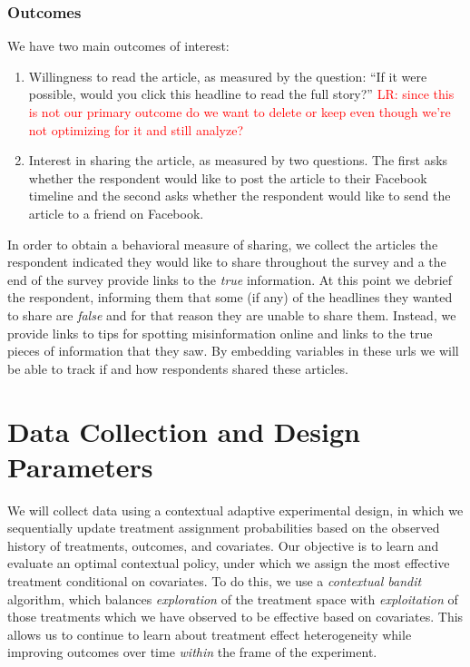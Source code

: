 \documentclass[letterpaper, 12pt, parskip=full,DIV=12]{scrartcl}
\begin{document}
\subsubsection{Outcomes}
We have two main outcomes of interest:

\begin{enumerate}
\item Willingness to read the article, as measured by the question: ``If it were possible, would you click this headline to read the full story?'' \textcolor{red}{LR: since this is not our primary outcome do we want to delete or keep even though we're not optimizing for it and still analyze?}
\item Interest in sharing the article, as measured by two questions. The first asks whether the respondent would like to post the article to their Facebook timeline and the second asks whether the respondent would like to send the article to a friend on Facebook. 
\end{enumerate}

In order to obtain a behavioral measure of sharing, we collect the articles the respondent indicated they would like to share throughout the survey and a the end of the survey provide links to the \textit{true} information. At this point we debrief the respondent, informing them that some (if any) of the headlines they wanted to share are \textit{false} and for that reason they are unable to share them. Instead, we provide links to tips for spotting misinformation online and links to the true pieces of information that they saw. By embedding variables in these urls we will be able to track if and how respondents shared these articles.




\section{Data Collection and Design Parameters}

We will collect data using a contextual adaptive experimental design, in which we sequentially update treatment assignment probabilities based on the observed history of treatments, outcomes, and covariates. Our objective is to learn and evaluate an optimal contextual policy, under which we assign the most effective treatment conditional on covariates. To do this, we use a \textit{contextual bandit} algorithm, which balances \textit{exploration} of the treatment space with \textit{exploitation} of those treatments which we have observed to be effective based on covariates.  This allows us to continue to learn about treatment effect heterogeneity while improving outcomes over time \textit{within} the frame of the experiment. 
\end{document}
